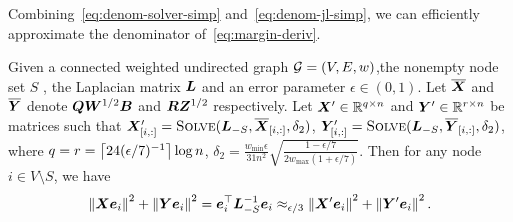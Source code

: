 \documentclass[sigconf]{acmart}
\begin{document}
Combining~\eqref{eq:denom-solver-simp} and~\eqref{eq:denom-jl-simp}, we can efficiently approximate the denominator of~\eqref{eq:margin-deriv}.
\begin{lemma}\label{lem:approx-denom}
    Given a connected weighted undirected graph \(\mathcal{G}=(V,E,w)\),the nonempty node set \(S\) , the Laplacian matrix \(\boldsymbol{L}\) and an error parameter \(\epsilon\in(0,1)\).
    Let \(\overline{\boldsymbol{X}}\) and \(\overline{\boldsymbol{Y}}\) denote \(\boldsymbol{Q}\boldsymbol{W}^{1/2}\boldsymbol{B}\) and \(\boldsymbol{R}\boldsymbol{Z}^{1/2}\) respectively.
    Let \(\boldsymbol{X}'\in\mathbb{R}^{q\times n}\) and \(\boldsymbol{Y}'\in\mathbb{R}^{r\times n}\) be matrices such that \(\boldsymbol{X}'_{[i,:]}=\textsc{Solve}(\boldsymbol{L}_{-S},\overline{\boldsymbol{X}}_{[i,:]},\delta_2)\), \(\boldsymbol{Y}'_{[i,:]}=\textsc{Solve}(\boldsymbol{L}_{-S},\overline{\boldsymbol{Y}}_{[i,:]},\delta_2)\), where \(q=r=\left\lceil24(\epsilon/7)^{-1}\right\rceil\log n\), \(\delta_2=\frac{w_{\min}\epsilon}{31n^2}\sqrt{\frac{1-\epsilon/7}{2w_{\max}(1+\epsilon/7)}}\). Then for any node \(i\in V\setminus S\), we have
    \begin{equation}\label{eq:approx-denom}
        \left\Vert\boldsymbol{X}\boldsymbol{e}_i\right\Vert^2+\left\Vert\boldsymbol{Y}\boldsymbol{e}_i\right\Vert^2=\boldsymbol{e}_i^\top\boldsymbol{L}_{-S}^{-1}\boldsymbol{e}_i\approx_{\epsilon/3}\left\Vert\boldsymbol{X}'\boldsymbol{e}_i\right\Vert^2+\left\Vert\boldsymbol{Y}'\boldsymbol{e}_i\right\Vert^2.
    \end{equation}
\end{lemma}
\end{document}
